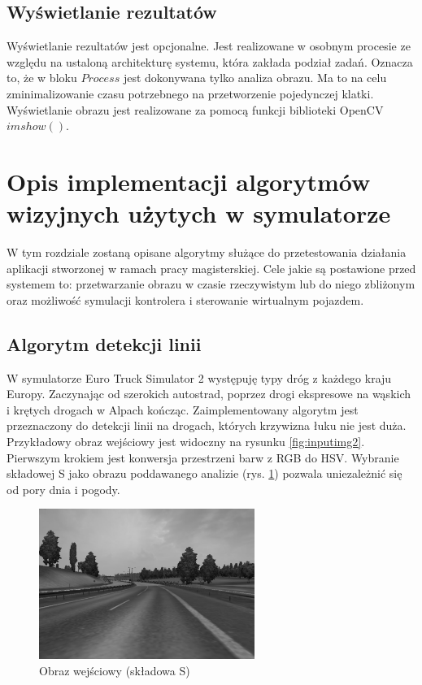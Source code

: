 \subsection{Wyświetlanie rezultatów}

Wyświetlanie rezultatów jest opcjonalne. 
Jest realizowane w osobnym procesie ze względu na ustaloną architekturę systemu, która zakłada podział zadań. 
Oznacza to, że w bloku $Process$ jest dokonywana tylko analiza obrazu. 
Ma to na celu zminimalizowanie czasu potrzebnego na przetworzenie pojedynczej klatki. 
Wyświetlanie obrazu jest realizowane za pomocą funkcji biblioteki OpenCV $imshow()$.


\section{Opis implementacji algorytmów wizyjnych użytych w symulatorze}
\label{sec:implem}
W tym rozdziale zostaną opisane algorytmy służące do przetestowania działania aplikacji stworzonej w ramach pracy magisterskiej. 
Cele jakie są postawione przed systemem to: przetwarzanie obrazu w czasie rzeczywistym lub do niego zbliżonym oraz możliwość symulacji kontrolera i sterowanie wirtualnym pojazdem. 

\subsection{Algorytm detekcji linii}

W symulatorze Euro Truck Simulator 2 występuję typy dróg z każdego kraju Europy. 
Zaczynając od szerokich autostrad, poprzez drogi ekspresowe na wąskich i krętych drogach w Alpach kończąc. 
Zaimplementowany algorytm jest przeznaczony do detekcji linii na drogach, których krzywizna łuku nie jest duża. 
Przykładowy obraz wejściowy jest widoczny na rysunku \ref{fig:inputimg2}. 
Pierwszym krokiem jest konwersja przestrzeni barw z RGB do HSV. 
Wybranie składowej S jako obrazu poddawanego analizie (rys. \ref{fig:alg1_S}) pozwala uniezależnić się od pory dnia i pogody.

\begin{figure}
  \centering
  \includegraphics[width=7cm]{img/alg1_gray.jpg}
  \caption{Obraz wejściowy (składowa S)}
  \label{fig:alg1_S}
\end{figure}

